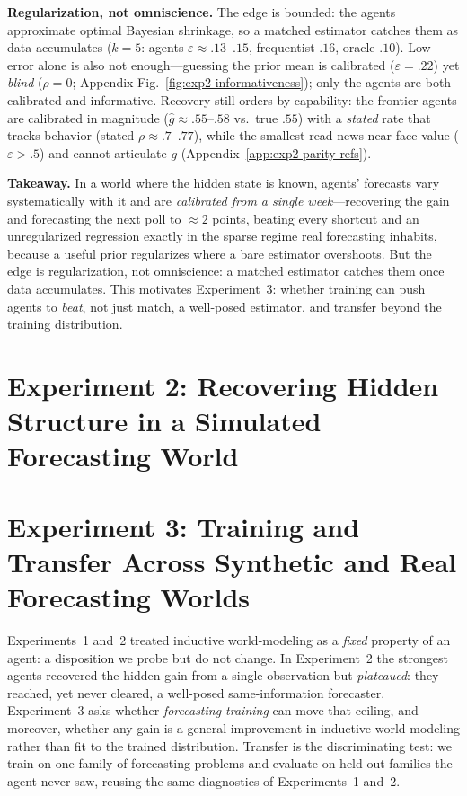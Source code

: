 \documentclass{article} %
\begin{document}
\textbf{Regularization, not omniscience.} The edge is bounded: the agents approximate optimal Bayesian shrinkage, so a matched estimator catches them as data accumulates ($k{=}5$: agents $\varepsilon{\approx}.13$--$.15$, frequentist $.16$, oracle $.10$). Low error alone is also not enough---guessing the prior mean is calibrated ($\varepsilon{=}.22$) yet \emph{blind} ($\rho{=}0$; Appendix Fig.~\ref{fig:exp2-informativeness}); only the agents are both calibrated and informative. Recovery still orders by capability: the frontier agents are calibrated in magnitude ($\overline{\hat g}{\approx}.55$--$.58$ vs.\ true $.55$) with a \emph{stated} rate that tracks behavior (stated-$\rho{\approx}.7$--$.77$), while the smallest read news near face value ($\varepsilon{>}.5$) and cannot articulate $g$ (Appendix~\ref{app:exp2-parity-refs}).

\textbf{Takeaway.} In a world where the hidden state is known, agents' forecasts vary systematically with it and are \emph{calibrated from a single week}---recovering the gain and forecasting the next poll to ${\approx}2$ points, beating every shortcut and an unregularized regression exactly in the sparse regime real forecasting inhabits, because a useful prior regularizes where a bare estimator overshoots. But the edge is regularization, not omniscience: a matched estimator catches them once data accumulates. This motivates Experiment~3: whether training can push agents to \emph{beat}, not just match, a well-posed estimator, and transfer beyond the training distribution.

\section{Experiment 2: Recovering Hidden Structure in a Simulated Forecasting World}
\label{sec:exp2}



\section{Experiment 3: Training and Transfer Across Synthetic and Real Forecasting Worlds}

Experiments~1 and~2 treated inductive world-modeling as a \emph{fixed} property of an agent: a
disposition we probe but do not change.
In Experiment~2 the strongest agents recovered the hidden gain from a single
observation but \emph{plateaued}: they reached, yet never cleared, a well-posed same-information
forecaster.
Experiment~3
asks whether \emph{forecasting training} can move that ceiling, and moreover, whether any gain is a general improvement in inductive world-modeling rather than fit to the trained distribution.
Transfer is the discriminating test: we train on one family of forecasting problems and evaluate on held-out families the agent never saw, reusing the same diagnostics of Experiments~1 and~2.
\end{document}
